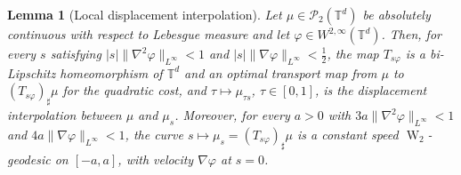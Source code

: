 \documentclass[11pt]{article}
\numberwithin{equation}{section}
\newtheorem{lemma}[theorem]{Lemma}
\theoremstyle{definition}
\newcommand{\T}{\mathbb{T}}
\newcommand{\Pcal}{\mathcal{P}}
\newcommand{\Wtwo}{\operatorname{W}_2}
\begin{document}
\begin{lemma}[Local displacement interpolation]
    \label{lem:local_displacement_interpolation}
    Let $\mu \in \Pcal_2(\T^d)$ be absolutely continuous with respect to Lebesgue measure and let $\varphi \in W^{2,\infty}(\T^d)$.
    Then, for every $s$ satisfying $|s| \|\nabla^2\varphi\|_{L^\infty} < 1$ and $|s| \|\nabla\varphi\|_{L^\infty} < \frac{1}{2}$, the map $T_{s\varphi}$ is a bi-Lipschitz homeomorphism of $\T^d$ and an optimal transport map from $\mu$ to $(T_{s\varphi})_\sharp\mu$ for the quadratic cost, and $\tau \mapsto \mu_{\tau s}$, $\tau \in [0,1]$, is the displacement interpolation between $\mu$ and $\mu_s$.
    Moreover, for every $a > 0$ with $3a \|\nabla^2\varphi\|_{L^\infty} < 1$ and $4a \|\nabla\varphi\|_{L^\infty} < 1$, the curve $s \mapsto \mu_s = (T_{s\varphi})_\sharp\mu$ is a constant speed $\Wtwo$-geodesic on $[-a,a]$, with velocity $\nabla\varphi$ at $s = 0$.
\end{lemma}
\end{document}

